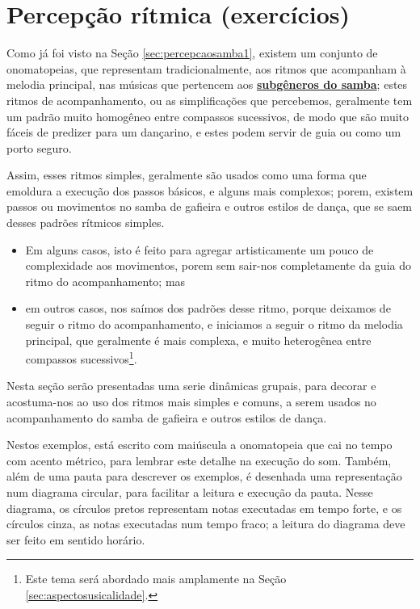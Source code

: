 \section{Percepção rítmica (exercícios)}



Como já foi visto na Seção \ref{sec:percepcaosamba1},
existem um conjunto de onomatopeias, que representam  tradicionalmente,
aos ritmos  que acompanham à melodia principal, 
nas músicas que pertencem aos \hyperref[sec:FamiliaSamba]{\textbf{subgêneros do samba}};
estes ritmos de acompanhamento, ou as simplificações que percebemos, 
geralmente tem um padrão muito homogêneo entre compassos sucessivos,
de modo que são muito fáceis de predizer para um dançarino, 
e estes podem servir de guia ou como um porto seguro.

Assim, esses ritmos simples, geralmente são usados como uma forma que emoldura a execução dos passos básicos,
e alguns mais complexos;
porem, existem passos ou movimentos no samba de gafieira e outros estilos de dança,
que se saem desses padrões rítmicos simples. 
\begin{itemize}
\item Em alguns casos,
isto é feito para agregar artisticamente um pouco de complexidade aos movimentos,
porem sem sair-nos completamente da guia do ritmo do acompanhamento; mas 
\item em outros casos, nos saímos dos padrões desse ritmo, 
porque deixamos de seguir o ritmo do acompanhamento,
e iniciamos a seguir o ritmo da melodia principal, que geralmente é mais complexa,
e muito heterogênea entre compassos sucessivos\footnote{Este 
tema será abordado mais amplamente na Seção \ref{sec:aspectosusicalidade}.}. 
\end{itemize}


Nesta seção serão presentadas uma serie dinâmicas grupais, 
para decorar e acostuma-nos ao uso dos ritmos mais simples e comuns, 
a serem usados no acompanhamento do samba de gafieira e outros estilos de dança.

Nestos exemplos, está escrito com maiúscula a onomatopeia 
que cai no tempo com acento métrico, para lembrar este detalhe na execução do som. 
Também, além de uma pauta para descrever os exemplos, 
é desenhada uma representação num diagrama circular,
para facilitar a leitura e execução da pauta.
Nesse diagrama, os círculos pretos representam notas executadas em tempo forte,
e os círculos cinza, as notas executadas num tempo fraco;
a leitura do diagrama deve ser feito em sentido horário.  

